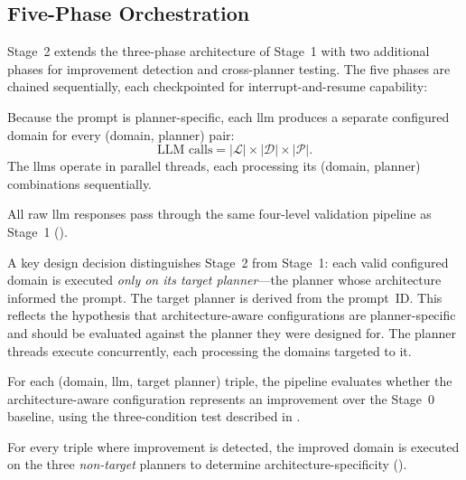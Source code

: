 \subsection{Five-Phase Orchestration}
\label{sec:design:stage2:orchestration}

Stage~2 extends the three-phase architecture of Stage~1 with two additional phases for improvement detection and cross-planner testing.
The five phases are chained sequentially, each checkpointed for interrupt-and-resume capability:

\begin{description}[style=nextline, leftmargin=1.5cm]
  \item[\textbf{Phase~A} (LLM Generation):]
    Because the prompt is planner-specific, each \gls{llm} produces a separate configured domain for every (domain, planner) pair:
    \begin{equation}\label{eq:stage2_llm_calls}
      \text{LLM calls} = |\mathcal{L}| \times |\mathcal{D}| \times |\mathcal{P}|.
    \end{equation}
    The \glspl{llm} operate in parallel threads, each processing its (domain, planner) combinations sequentially.

  \item[\textbf{Phase~B} (Validation):]
    All raw \gls{llm} responses pass through the same four-level validation pipeline as Stage~1 ().

  \item[\textbf{Phase~C} (Target-Planner Execution):]
    A key design decision distinguishes Stage~2 from Stage~1: each valid configured domain is executed \emph{only on its target planner}---the planner whose architecture informed the prompt.
    The target planner is derived from the prompt~ID.
    This reflects the hypothesis that architecture-aware configurations are planner-specific and should be evaluated against the planner they were designed for.
    The planner threads execute concurrently, each processing the domains targeted to it.

  \item[\textbf{Phase~D} (Improvement Detection):]
    For each (domain, \gls{llm}, target planner) triple, the pipeline evaluates whether the architecture-aware configuration represents an improvement over the Stage~0 baseline, using the three-condition test described in .

  \item[\textbf{Phase~E} (Cross-Planner Testing):]
    For every triple where improvement is detected, the improved domain is executed on the three \emph{non-target} planners to determine architecture-specificity ().
\end{description}

